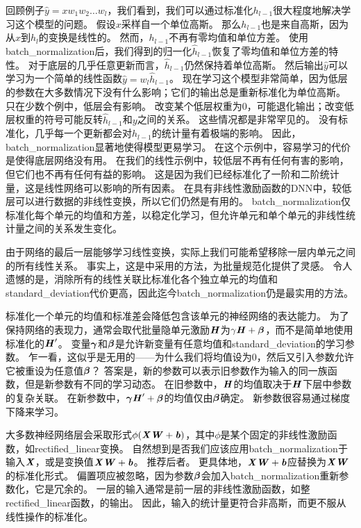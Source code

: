 回顾例子$\hat{y} = x w_1 w_2 \dots w_l$，我们看到，我们可以通过标准化$h_{l-1}$很大程度地解决学习这个模型的问题。
假设$x$采样自一个单位高斯。
那么$h_{l-1}$也是来自高斯，因为从$x$到$h_l$的变换是线性的。
然而，$h_{l-1}$不再有零均值和单位方差。
使用\gls{batch_normalization}后，我们得到的归一化$\hat{h}_{l-1}$恢复了零均值和单位方差的特性。
对于底层的几乎任意更新而言，$\hat{h}_{l-1}$仍然保持着单位高斯。
然后输出$\hat{y}$可以学习为一个简单的线性函数$\hat{y} = w_l \hat{h}_{l-1}$。
现在学习这个模型非常简单，因为低层的参数在大多数情况下没有什么影响；它们的输出总是重新标准化为单位高斯。
只在少数个例中，低层会有影响。
改变某个低层权重为$0$，可能退化输出；改变低层权重的符号可能反转$\hat{h}_{l-1}$和$y$之间的关系。
这些情况都是非常罕见的。
没有标准化，几乎每一个更新都会对$h_{l-1}$的统计量有着极端的影响。
因此，\gls{batch_normalization}显著地使得模型更易学习。
在这个示例中，容易学习的代价是使得底层网络没有用。
在我们的线性示例中，较低层不再有任何有害的影响，但它们也不再有任何有益的影响。
这是因为我们已经标准化了一阶和二阶统计量，这是线性网络可以影响的所有因素。
在具有非线性激励函数的\gls{DNN}中，较低层可以进行数据的非线性变换，所以它们仍然是有用的。
\gls{batch_normalization}仅标准化每个单元的均值和方差，以稳定化学习，但允许单元和单个单元的非线性统计量之间的关系发生变化。

由于网络的最后一层能够学习线性变换，实际上我们可能希望移除一层内单元之间的所有线性关系。
事实上，这是\cite{Desjardins2015}中采用的方法，为批量规范化提供了灵感。
令人遗憾的是，消除所有的线性关联比标准化各个独立单元的均值和\gls{standard_deviation}代价更高，因此迄今\gls{batch_normalization}仍是最实用的方法。


标准化一个单元的均值和标准差会降低包含该单元的神经网络的表达能力。
为了保持网络的表现力，通常会取代批量隐单元激励$\boldsymbol{\mathit{H}}$为$\gamma \boldsymbol{\mathit{H}} + \boldsymbol{\beta}$，而不是简单地使用标准化的$\boldsymbol{\mathit{H}}'$。
变量$\boldsymbol{\gamma}$和$\boldsymbol{\beta}$是允许新变量有任意均值和\gls{standard_deviation}的学习参数。
乍一看，这似乎是无用的——为什么我们将均值设为$0$，然后又引入参数允许它被重设为任意值$\boldsymbol{\beta}$？
答案是，新的参数可以表示旧参数作为输入的同一族函数，但是新参数有不同的学习动态。
在旧参数中，$\boldsymbol{\mathit{H}}$的均值取决于$\boldsymbol{\mathit{H}}$下层中参数的复杂关联。
在新参数中，$\boldsymbol{\gamma} \boldsymbol{\mathit{H}}' + \boldsymbol{\beta}$的均值仅由$\boldsymbol{\beta}$确定。
新参数很容易通过梯度下降来学习。

大多数神经网络层会采取形式$\phi(\boldsymbol{\mathit{X}}\boldsymbol{\mathit{W}}+ \boldsymbol{\mathit{b}})$，其中$\phi$是某个固定的非线性激励函数，如\gls{rectified_linear}变换。
自然想到是否我们应该应用\gls{batch_normalization}于输入$\boldsymbol{\mathit{X}}$，或是变换值$\boldsymbol{\mathit{X}}\boldsymbol{\mathit{W}}+\boldsymbol{\mathit{b}}$。
\cite{Ioffe+Szegedy-2015}推荐后者。
更具体地，$\boldsymbol{\mathit{X}}\boldsymbol{\mathit{W}}+\boldsymbol{\mathit{b}}$应替换为$\boldsymbol{\mathit{X}}\boldsymbol{\mathit{W}}$的标准化形式。
偏置项应被忽略，因为参数$\boldsymbol{\beta}$会加入\gls{batch_normalization}重新参数化，它是冗余的。
一层的输入通常是前一层的非线性激励函数，如整\gls{rectified_linear}函数，的输出。
因此，输入的统计量更符合非高斯，而更不服从线性操作的标准化。

